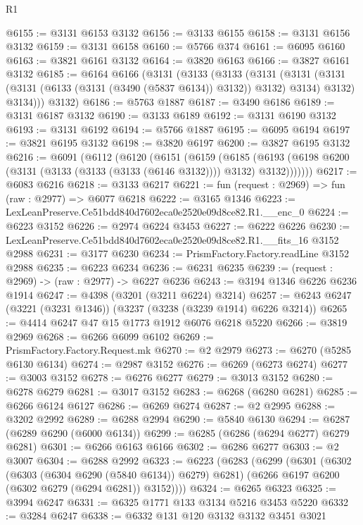 \begin{lexlean}{R1}
\begin{coremodule}
@6155 := @3131 @6153 @3132
@6156 := @3133 @6155
@6158 := @3131 @6156 @3132
@6159 := @3131 @6158
@6160 := @5766 @374
@6161 := @6095 @6160
@6163 := @3821 @6161 @3132
@6164 := @3820 @6163
@6166 := @3827 @6161 @3132
@6185 := @6164
    @6166
    (@3131
      (@3133
        (@3133
          (@3131
            (@3131 (@3131 (@3131 (@6133 (@3131 (@3490 (@5837 @6134)) @3132)) @3132) @3134) @3132)
            @3134)))
      @3132)
@6186 := @5763 @1887
@6187 := @3490 @6186
@6189 := @3131 @6187 @3132
@6190 := @3133 @6189
@6192 := @3131 @6190 @3132
@6193 := @3131 @6192
@6194 := @5766 @1887
@6195 := @6095 @6194
@6197 := @3821 @6195 @3132
@6198 := @3820 @6197
@6200 := @3827 @6195 @3132
@6216 := @6091
    (@6112
      (@6120
        (@6151
          (@6159
            (@6185
              (@6193 (@6198 @6200 (@3131 (@3133 (@3133 (@3133 (@6146 @3132)))) @3132) @3132)))))))
@6217 := @6083 @6216
@6218 := @3133 @6217
@6221 := fun (request : @2969) => fun (raw : @2977) => @6077 @6218
@6222 := @3165 @1346
@6223 := LexLeanPreserve.Ce51bdd840d7602eca0e2520e09d8ce82.R1.__enc_0
@6224 := @6223 @3152
@6226 := @2974 @6224 @3453
@6227 := @6222 @6226
@6230 := LexLeanPreserve.Ce51bdd840d7602eca0e2520e09d8ce82.R1.__fits_16 @3152 @2988
@6231 := @3177 @6230
@6234 := PrismFactory.Factory.readLine @3152 @2988
@6235 := @6223 @6234
@6236 := @6231 @6235
@6239 := (request : @2969) -> (raw : @2977) -> @6227 @6236
@6243 := @3194 @1346 @6226 @6236 @1914
@6247 := @4398 (@3201 (@3211 @6224) @3214)
@6257 := @6243 @6247 (@3221 (@3231 @1346)) (@3237 (@3238 (@3239 @1914) @6226 @3214))
@6265 := @4414 @6247 @47 @15 @1773 @1912 @6076 @6218 @5220
@6266 := @3819 @2969
@6268 := @6266 @6099 @6102
@6269 := PrismFactory.Factory.Request.mk
@6270 := @2 @2979
@6273 := @6270 (@5285 @6130 @6134)
@6274 := @2987 @3152
@6276 := @6269 (@6273 @6274)
@6277 := @3003 @3152
@6278 := @6276 @6277
@6279 := @3013 @3152
@6280 := @6278 @6279
@6281 := @3017 @3152
@6283 := @6268 (@6280 @6281)
@6285 := @6266 @6124 @6127
@6286 := @6269 @6274
@6287 := @2 @2995
@6288 := @3202 @2992
@6289 := @6288 @2994
@6290 := @5840 @6130
@6294 := @6287 (@6289 @6290 (@6000 @6134))
@6299 := @6285 (@6286 (@6294 @6277) @6279 @6281)
@6301 := @6266 @6163 @6166
@6302 := @6286 @6277
@6303 := @2 @3007
@6304 := @6288 @2992
@6323 := @6223
    (@6283
      (@6299
        (@6301
          (@6302 (@6303 (@6304 @6290 (@5840 @6134)) @6279) @6281)
          (@6266 @6197 @6200 (@6302 @6279 (@6294 @6281)) @3152))))
@6324 := @6265 @6323
@6325 := @3994 @6247
@6331 := @6325 @1771 @133 @3134 @5216 @3453 @5220
@6332 := @3284 @6247
@6338 := @6332 @131 @120 @3132 @3132 @3451 @3021

\end{coremodule}
\end{lexlean}
